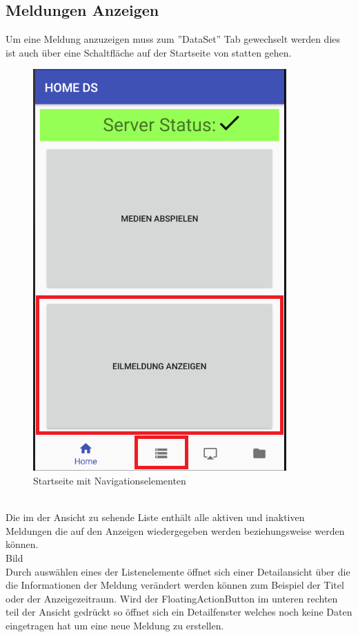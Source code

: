 \subsection{Meldungen Anzeigen}
Um eine Meldung anzuzeigen muss zum ''DataSet'' Tab gewechselt werden dies ist auch über eine Schaltfläche auf der Startseite von statten gehen.
\begin{figure}[H]
\centering
\includegraphics[scale=0.35]{images/06_AndroidApp/06_dataSetNavigation}
\caption{Startseite mit Navigationselementen}
\label{fig:mediaNav}
\end{figure}
\\
Die im der Ansicht zu sehende Liste enthält alle aktiven und  inaktiven Meldungen die auf den Anzeigen wiedergegeben werden beziehungsweise werden können. 
\\
Bild 
\\
Durch auswählen eines der Listenelemente öffnet sich einer Detailansicht über die die Informationen der Meldung verändert werden können zum Beispiel der Titel oder der Anzeigezeitraum. Wird der FloatingActionButton im unteren rechten teil der Ansicht gedrückt so öffnet sich ein Detailfenster welches noch keine Daten eingetragen hat um eine neue Meldung zu erstellen.
